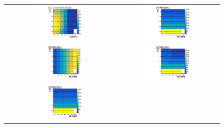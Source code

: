 \begin{figure}[htb]
  \begin{tabular}{cc}
\includegraphics[width=0.49\textwidth]{2HDM/varytanbeta/sinp_0p1/MH750_MA500_MDM1/2HDMPZ2_xsec_varytanb_sinp0p1.pdf} &
\includegraphics[width=0.49\textwidth]{2HDM/varytanbeta/sinp_0p1/MH750_MA500_MDM1/2HDMPZ2_hcwidth_varytanb_sinp0p1.pdf} \\
\includegraphics[width=0.49\textwidth]{2HDM/varytanbeta/sinp_0p1/MH750_MA500_MDM1/2HDMPZ2_h4width_varytanb_sinp0p1.pdf} &
\includegraphics[width=0.49\textwidth]{2HDM/varytanbeta/sinp_0p1/MH750_MA500_MDM1/2HDMPZ2_h3width_varytanb_sinp0p1.pdf} \\
\includegraphics[width=0.49\textwidth]{2HDM/varytanbeta/sinp_0p1/MH750_MA500_MDM1/2HDMPZ2_h2width_varytanb_sinp0p1.pdf} &

\end{tabular}
\end{figure}
